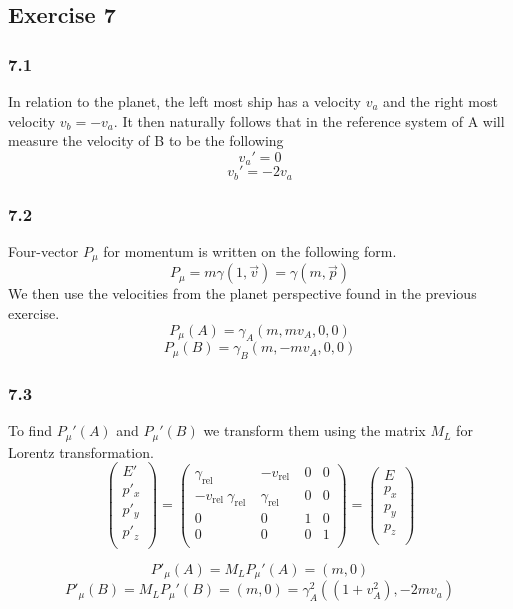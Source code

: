 \documentclass[reprint,english,notitlepage]{revtex4-2}
\begin{document}
\subsection{Exercise 7}
\subsubsection*{7.1}
In relation to the planet, the left most ship has a velocity $ v_a $ and the right most velocity $ v_{b} = -v_a $. It then naturally follows that in the reference system of A will measure the velocity of B to be the following
\[
v_a' = 0 
\]
\[
v_b' = -2 v_a
\]
\subsubsection*{7.2}
Four-vector $ P_{μ} $ for momentum is written on the following form. 
\[
P_{μ} = m γ(1, \vec{v}) = γ(m,\vec{p})
\]
We then use the velocities from the planet perspective found in the previous exercise. 
\[
P_{μ}(A) = γ_{A}(m, mv_{A}, 0, 0)
\]
\[
P_{μ}(B) = γ_{B}(m, -mv_{A}, 0, 0)
\]

\subsubsection*{7.3}
To find $ P_{μ}'(A) $ and $ P_{μ}'(B) $ we transform them using the  matrix $ M_L $ for Lorentz transformation. 
\[
  \begin{pmatrix}
    E' \\
    p'_{x} \\
    p'_{y} \\
    p'_{z} \\
   \end{pmatrix} = 
   \begin{pmatrix}
     γ_{\text{rel }} & - v_{\text{rel }} &0  &0  \\
      -v_{\text{rel }} γ_{\text{rel }}&γ_{\text{rel }}  &0  &0  \\
      0&  0&  1& 0 \\
      0&  0&  0& 1 \\
    \end{pmatrix} = 
    \begin{pmatrix}
       E \\
       p_{x} \\
       p_{y} \\
       p_{z} \\
      \end{pmatrix}
\]

\[
P'_{μ}(A) = M_L P_{μ}'(A) = (m,0)
\]
\[
  P'_{μ}(B) = M_L P_{μ}'(B) = (m,0) = γ^{2}_{A}((1 + v^{2}_{A}), - 2mv_{a})
\]
\end{document}
